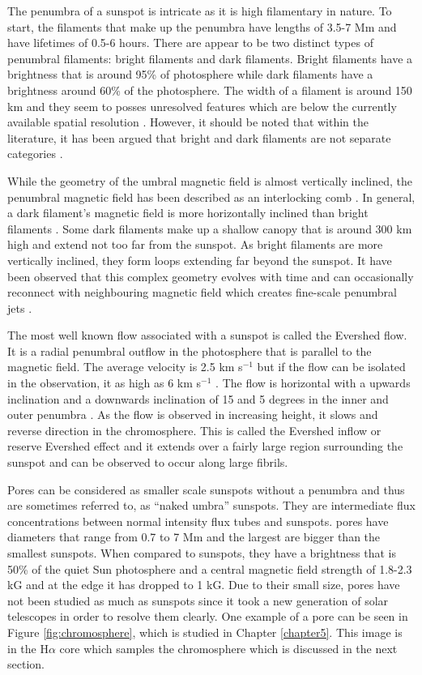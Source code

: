 	The penumbra of a sunspot is intricate as it is high filamentary in nature.
	To start, the filaments that make up the penumbra have lengths of 3.5-7 Mm and have lifetimes of 0.5-6 hours.
	There are appear to be two distinct types of penumbral filaments: bright filaments and dark filaments.
	Bright filaments have a brightness that is around 95\% of photosphere while dark filaments have a brightness around 60\% of the photosphere.
	The width of a filament is around 150 km and they seem to posses unresolved features which are below the currently available spatial resolution \citep{2002Natur.420..151S,2011Sci...333..316S}.
	However, it should be noted that within the literature, it has been argued that bright and dark filaments are not separate categories \citep{2013A&A...557A..25T}. 
	
	While the geometry of the umbral magnetic field is almost vertically inclined, the penumbral magnetic field has been described as an interlocking comb \citep{2002Natur.420..390T}.
	In general, a dark filament's magnetic field is more horizontally inclined than bright filaments \citep{2005A&A...436.1087L}.
	Some dark filaments make up a shallow canopy that is around 300 km high and extend not too far from the sunspot.
	As bright filaments are more vertically inclined, they form loops extending far beyond the sunspot.
	It have been observed that this complex geometry evolves with time and can occasionally reconnect with neighbouring magnetic field which creates fine-scale penumbral jets \citep{2007Sci...318.1594K}.
	
	The most well known flow associated with a sunspot is called the Evershed flow.
	It is a radial penumbral outflow in the photosphere that is parallel to the magnetic field.
	The average velocity is 2.5 km s$^{-1}$ but if the flow can be isolated in the observation, it as high as 6 km s$^{-1}$ \citep{2003A&A...403L..47B}.
	The flow is horizontal with a upwards inclination and a downwards inclination of 15 and 5 degrees in the inner and outer penumbra \citep{2004A&A...415..717T}.
	As the flow is observed in increasing height, it slows and reverse direction in the chromosphere.
	This is called the Evershed inflow or reserve Evershed effect and it extends over a fairly large region surrounding the sunspot and can be observed to occur along large fibrils.
	
    Pores can be considered as smaller scale sunspots without a penumbra and thus are sometimes referred to, as ``naked umbra'' sunspots.
    They are intermediate flux concentrations between normal intensity flux tubes and sunspots.
	pores have diameters that range from 0.7 to 7 Mm and the largest are bigger than the smallest sunspots.
	When compared to sunspots, they have a brightness that is 50\% of the quiet Sun photosphere and a central magnetic field strength of 1.8-2.3 kG and at the edge it has dropped to 1 kG.
    Due to their small size, pores have not been studied as much as sunspots since it took a new generation of solar telescopes in order to resolve them clearly.
    One example of a pore can be seen in Figure \ref{fig:chromosphere}, which is studied in Chapter \ref{chapter5}.
    This image is in the H$\alpha$ core which samples the chromosphere which is discussed in the next section.

